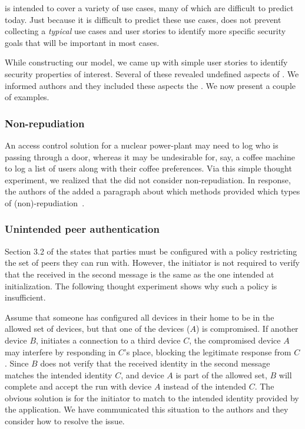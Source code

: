 \documentclass[runningheads, envcountsame, a4paper, draft, x11names]{llncs}
\newcommand{\spacehack}{\vspace{-1em}}
\begin{document}
\mEdhoc{} is intended to cover a variety of use cases, many of which are
difficult to predict today.
%
Just because it is difficult to predict these use cases, does not
prevent collecting a \emph{typical} use cases and user stories
to identify more specific security goals that will be important in most cases.
%

While constructing our model, we came up with simple user stories to identify
security properties of interest.
%
Several of these revealed undefined aspects of \mEdhoc{}.
%
We informed \mEdhoc{} authors and they included these aspects the \mSpec{}.
%
We now present a couple of examples.
%

\spacehack
\subsubsection{Non-repudiation}
An access control solution for a nuclear power-plant may need to log who is
passing through a door, whereas it may be undesirable for, say, a coffee
machine to log a list of users along with their coffee preferences.
%
Via this simple thought experiment, we realized that the \mSpec{} did not
consider non-repudiation.
%
In response, the authors of the \mSpec{} added a paragraph about which methods
provided which types of (non)-repudiation~\cite{personalCommunication}.

\spacehack
\subsubsection{Unintended peer authentication}
Section 3.2 of the \mSpec{} states that parties must be configured
with a policy restricting the set of peers they can run \mEdhoc{} with.
%
However, the initiator is not required to verify that the \mIdcredr{} received
in the second message is the same as the one intended at initialization.
%
The following thought experiment shows why such a policy is insufficient.
%

Assume that someone has configured all devices in their home to be in the
allowed set of devices, but that one of the devices ($A$) is compromised.
%
If another device $B$, initiates a connection to a third device $C$, the
compromised device $A$ may interfere by responding in $C$'s place, blocking
the legitimate response from $C$.
%
Since $B$ does not verify that the received identity in the second message
matches the intended identity $C$, and device $A$ is part of the allowed set,
$B$ will complete and accept the \mEdhoc{} run with device $A$ instead of the
intended $C$.
%
The obvious solution is for the initiator to match \mIdcredr{} to the intended
identity provided by the application.
%
We have communicated this situation to the \mEdhoc{} authors and they consider
how to resolve the issue.
%
\end{document}
